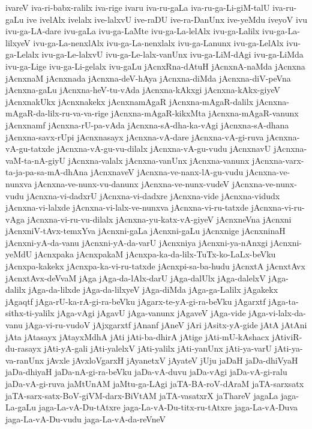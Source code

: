 {ivareV
iva-ri-babx-ralilx
iva-rige
ivaru
iva-ru-gaLa
iva-ru-ga-Li-giM-talU
iva-ru-gaLu
ive
ivelAlx
ivelalx
ive-lalxvU
ive-raDU
ive-ra-DanUnx
ive-yeMdu
iveyoV
ivu
ivu-ga-LA-dare
ivu-gaLa
ivu-ga-LaMte
ivu-ga-La-lelAlx
ivu-ga-Lalilx
ivu-ga-La-lilxyeV
ivu-ga-La-nenxlAlx
ivu-ga-La-nenxlalx
ivu-ga-Lanunx
ivu-ga-LelAlx
ivu-ga-Lelalx
ivu-ga-Le-lalxvU
ivu-ga-Le-lalx-vanUnx
ivu-ga-LiM-dAgi
ivu-ga-LiMda
ivu-ga-Lige
ivu-ga-Li-gelalx
ivu-gaLu
jAcnxRna-dAtuH
jAcnxnA-naMda
jAcnxna
jAcnxnaM
jAcnxnada
jAcnxna-deV-hAya
jAcnxna-diMda
jAcnxna-diV-peVna
jAcnxna-gaLu
jAcnxna-heV-tu-vAda
jAcnxna-kAkxgi
jAcnxna-kAkx-giyeV
jAcnxnakUkx
jAcnxnakekx
jAcnxnamAgaR
jAcnxna-mAgaR-dalilx
jAcnxna-mAgaR-da-lilx-ru-va-va-rige
jAcnxna-mAgaR-kikxMta
jAcnxna-mAgaR-vanunx
jAcnxnamf
jAcnxna-rU-pa-vAda
jAcnxna-sA-dha-ka-vAgi
jAcnxna-sA-dhana
jAcnxna-savx-rUpi
jAcnxnasayx
jAcnxna-vA-dare
jAcnxna-vA-gi-ruva
jAcnxna-vA-gu-tatxde
jAcnxna-vA-gu-vu-dilalx
jAcnxna-vA-gu-vudu
jAcnxnavU
jAcnxna-vaM-ta-nA-giyU
jAcnxna-valalx
jAcnxna-vanUnx
jAcnxna-vanunx
jAcnxna-varx-ta-ja-pa-sa-mA-dhAna
jAcnxnaveV
jAcnxna-ve-nanx-lA-gu-vudu
jAcnxna-ve-nunxva
jAcnxna-ve-nunx-vu-danunx
jAcnxna-ve-nunx-vudeV
jAcnxna-ve-nunx-vudu
jAcnxna-vi-dadxrU
jAcnxna-vi-dadxre
jAcnxna-vide
jAcnxna-vidudx
jAcnxna-vi-lalxde
jAcnxna-vi-lalx-ve-nunxva
jAcnxna-vi-ru-tatxde
jAcnxna-vi-ru-vAga
jAcnxna-vi-ru-vu-dilalx
jAcnxna-yu-katx-vA-giyeV
jAcnxneVna
jAcnxni
jAcnxniV-tAvx-temxYva
jAcnxni-gaLa
jAcnxni-gaLu
jAcnxnige
jAcnxninaH
jAcnxni-yA-da-vanu
jAcnxni-yA-da-varU
jAcnxniya
jAcnxni-ya-nAnxgi
jAcnxni-yeMdU
jAcnxpaka
jAcnxpakaM
jAcnxpa-ka-da-lilx-TuTx-ko-LaLx-beVku
jAcnxpa-kakekx
jAcnxpa-ka-vi-ru-tatxde
jAcnxpi-sa-ba-hudu
jAcnxtA
jAcnxtAvx
jAcnxtAvx-deVvaM
jAga
jAga-da-lAlx-darU
jAga-dalUlx
jAga-dalelxV
jAga-dalilx
jAga-da-lilxde
jAga-da-lilxyeV
jAga-diMda
jAga-ga-Lalilx
jAgakekx
jAgaqtf
jAga-rU-ka-rA-gi-ra-beVku
jAgarx-te-yA-gi-ra-beVku
jAgarxtf
jAga-ta-sithx-ti-yalilx
jAga-vAgi
jAgavU
jAga-vanunx
jAgaveV
jAga-vide
jAga-vi-lalx-da-vanu
jAga-vi-ru-vudoV
jAjxgarxtf
jAnanf
jAneV
jAri
jAsitx-yA-gide
jAtA
jAtAni
jAta
jAtasayx
jAtayxMdhA
jAti
jAti-ba-dhirA
jAtige
jAti-mU-kAshacx
jAtiviR-du-rasayx
jAti-yA-gali
jAti-yalelxV
jAti-yalilx
jAti-yanUnx
jAti-ya-varU
jAti-ya-va-ranUnx
jAvxle
jAvxloVgarxH
jAyanetxV
jAyateV
jUju
jaDaH
jaDa-dhiVyaH
jaDa-dhiyaH
jaDa-nA-gi-ra-beVku
jaDa-vA-duvu
jaDa-vAgi
jaDa-vA-gi-ralu
jaDa-vA-gi-ruva
jaMtUnAM
jaMtu-ga-LAgi
jaTA-BA-roV-dAraM
jaTA-sarxsatx
jaTA-sarx-satx-BoV-giVM-darx-BiVtAM
jaTA-vasatxrX
jaThareV
jagaLa
jaga-La-gaLu
jaga-La-vA-Du-tAtxre
jaga-La-vA-Du-titx-ru-tAtxre
jaga-La-vA-Duva
jaga-La-vA-Du-vudu
jaga-La-vA-da-reVneV
}
